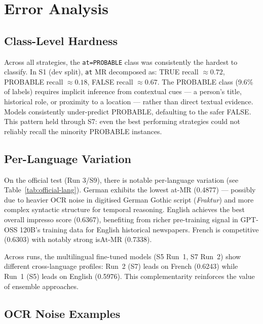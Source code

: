 \documentclass{ceurart}
\begin{document}
\section{Error Analysis}
\label{sec:error}

\subsection{Class-Level Hardness}

Across all strategies, the \texttt{at=PROBABLE} class was consistently the hardest to classify. In S1 (dev split), \texttt{at} MR decomposed as: TRUE recall $\approx 0.72$, PROBABLE recall $\approx 0.18$, FALSE recall $\approx 0.67$. The PROBABLE class (9.6\% of labels) requires implicit inference from contextual cues --- a person's title, historical role, or proximity to a location --- rather than direct textual evidence. Models consistently under-predict PROBABLE, defaulting to the safer FALSE. This pattern held through S7: even the best performing strategies could not reliably recall the minority PROBABLE instances.

\subsection{Per-Language Variation}

On the official test (Run 3/S9), there is notable per-language variation (see Table~\ref{tab:official-lang}). German exhibits the lowest at-MR (0.4877) --- possibly due to heavier OCR noise in digitised German Gothic script (\textit{Fraktur}) and more complex syntactic structure for temporal reasoning. English achieves the best overall impresso score (0.6367), benefiting from richer pre-training signal in GPT-OSS 120B's training data for English historical newspapers. French is competitive (0.6303) with notably strong isAt-MR (0.7338).

Across runs, the multilingual fine-tuned models (S5 Run~1, S7 Run~2) show different cross-language profiles: Run~2 (S7) leads on French (0.6243) while Run~1 (S5) leads on English (0.5976). This complementarity reinforces the value of ensemble approaches.

\subsection{OCR Noise Examples}
\end{document}
